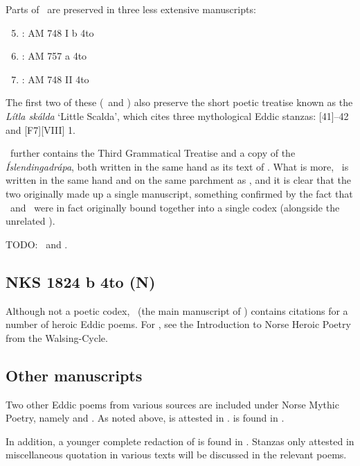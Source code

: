 Parts of \Skaldskaparmal\ are preserved in three less extensive manuscripts:

\begin{enumerate}
  \setcounter{enumi}{4}
  \item \AMb: AM 748 I b 4to
  \item \EddaBms: AM 757 a 4to
  \item \EddaCms: AM 748 II 4to
\end{enumerate}

The first two of these (\AMb\ and \EddaBms) also preserve the short poetic treatise known as the \emph{Lítla skálda} ‘Little Scalda’, which cites three mythological Eddic stanzas: [41]--42 and [F7][VIII] 1.

\AMb\ further contains the Third Grammatical Treatise and a copy of the \emph{Íslendingadrápa}, both written in the same hand as its text of \Skaldskaparmal.  What is more, \AMb\ is written in the same hand and on the same parchment as \AM, and it is clear that the two originally made up a single manuscript, something confirmed by the fact that \AM\ and \AMb\ were in fact originally bound together into a single codex (alongside the unrelated \EddaCms).

TODO: \EddaBms\ and \EddaCms.

\subsection{NKS 1824 b 4to (N)}

Although not a poetic codex, \VolsungaMS\ (the main manuscript of \VolsungaSaga) contains citations for a number of heroic Eddic poems.  For \VolsungaSaga, see the Introduction to Norse Heroic Poetry from the Walsing-Cycle.

\subsection{Other manuscripts}

Two other Eddic poems from various sources are included under Norse Mythic Poetry, namely  and .  As noted above,  is attested in \Wormianus.   is found in \FlatMS.

In addition, a younger complete redaction of  is found in \Hauksbok.  Stanzas only attested in miscellaneous quotation in various texts will be discussed in the relevant poems.

